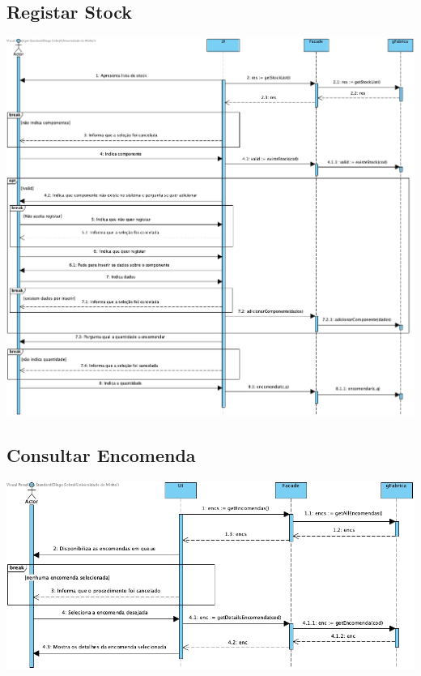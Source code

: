 \subsection{Registar Stock}
\begin{center}
 	\includegraphics[width = 5.5in]{DSSS/DSSS-Registar_Stock.jpg}
\end{center}

\subsection{Consultar Encomenda}
\begin{center}
 	\includegraphics[width = 5.5in]{DSSS/DSSS-Consultar_encomenda.jpg}
\end{center}

